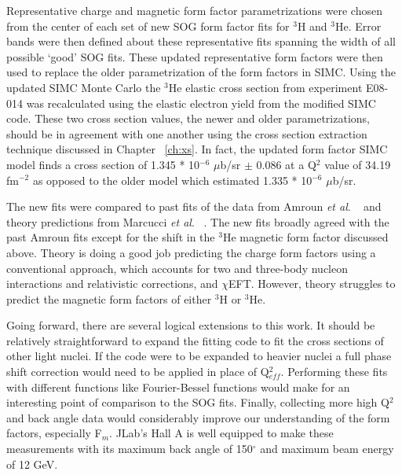 Representative charge and magnetic form factor parametrizations were chosen from the center of each set of new SOG form factor fits for $^3$H and $^3$He. Error bands were then defined about these representative fits spanning the width of all possible `good' SOG fits. These updated representative form factors were then used to replace the older parametrization of the form factors in SIMC. Using the updated SIMC Monte Carlo the $^3$He elastic cross section from experiment E08-014 was recalculated using the elastic electron yield from the modified SIMC code. These two cross section values, the newer and older parametrizations, should be in agreement with one another using the cross section extraction technique discussed in Chapter ~\ref{ch:xs}. In fact, the updated form factor SIMC model finds a cross section of 1.345 * 10$^{-6}$ $\mu$b/sr $\pm$ 0.086 at a Q$^2$ value of 34.19 fm$^{-2}$ as opposed to the older model which estimated 1.335 * 10$^{-6}$ $\mu$b/sr.

The new fits were compared to past fits of the data from Amroun \textit{et al}. ~\cite{Article:Amroun} and theory predictions from Marcucci \textit{et al}. ~\cite{Article:Marcucci}. The new fits broadly agreed with the past Amroun fits except for the shift in the $^3$He magnetic form factor discussed above. Theory is doing a good job predicting the charge form factors using a conventional approach, which accounts for two and three-body nucleon interactions and relativistic corrections, and $\chi$EFT. However, theory struggles to predict the magnetic form factors of either $^3$H or $^3$He. 

Going forward, there are several logical extensions to this work. It should be relatively straightforward to expand the fitting code to fit the cross sections of other light nuclei. If the code were to be expanded to heavier nuclei a full phase shift correction would need to be applied in place of Q$^2_{eff}$. Performing these fits with different functions like Fourier-Bessel functions would make for an interesting point of comparison to the SOG fits. Finally, collecting more high Q$^2$ and back angle data would considerably improve our understanding of the form factors, especially F$_m$. JLab's Hall A is well equipped to make these measurements with its maximum back angle of 150$^{\circ}$ and maximum beam energy of 12 GeV.